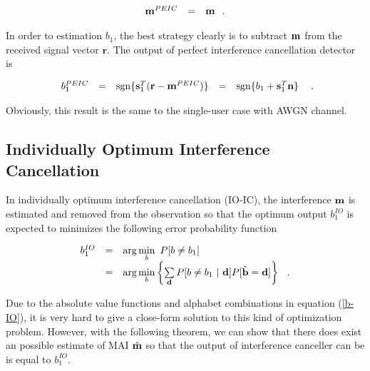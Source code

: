 \documentclass[a4paper,12pt,fleqn]{article}
\newcommand{\br}{{\mathbf r}}
\newcommand{\bb}{{\bf b}}
\newcommand{\bd}{{\bf d}}
\newcommand{\bs}{{\bf s}}
\newcommand{\bn}{{\bf n}}
\newcommand{\bm}{{\bf m}}
\begin{document}
\begin{equation}
\begin{array}{rcl}
\bm^{PEIC}&=&\bm\hspace{0.1in}.
\end{array}
\end{equation}

In order to estimation $b_1$, the best strategy clearly is to
subtract $\bm$ from the received signal vector $\br$. The output
of perfect interference cancellation detector is

\begin{equation}
\begin{array}{rcccl}
b_1^{PEIC}&=&\mbox{sgn}\{\bs_1^T(\br-\bm^{PEIC})\}&=&\mbox{sgn}\{b_1+\bs_1^T\bn\}
\end{array}\hspace{0.1in}.
\end{equation}

Obviously, this result is the same to the single-user case with
AWGN channel.

\subsection{Individually Optimum Interference Cancellation}

In individually optimum interference cancellation (IO-IC), the
interference $\bm$ is estimated and removed from the observation
so that the optimum output $b_1^{IO}$ is expected to minimizes the
following error probability function

\begin{equation}
\begin{array}{rcl}
b_1^{IO}&=&\mbox{arg}\min\limits_{b}\ P[b\neq b_1]\\
&=&\mbox{arg}\min\limits_{b}\left\{\sum\limits_{\bd}P[b\neq b_1\
|\ \bd]P[\tilde{\bb}=\bd]\right\} \hspace{0.1in}.
\end{array}\label{b-IO}
\end{equation}

Due to the absolute value functions and alphabet combinations in
equation (\ref{b-IO}), it is very hard to give a close-form
solution to this kind of optimization problem. However, with the
following theorem, we can show that there does exist an possible
estimate of MAI $\hat{\bm}$ so that the output of interference
canceller can be is equal to $b_1^{IO}$.
\end{document}
